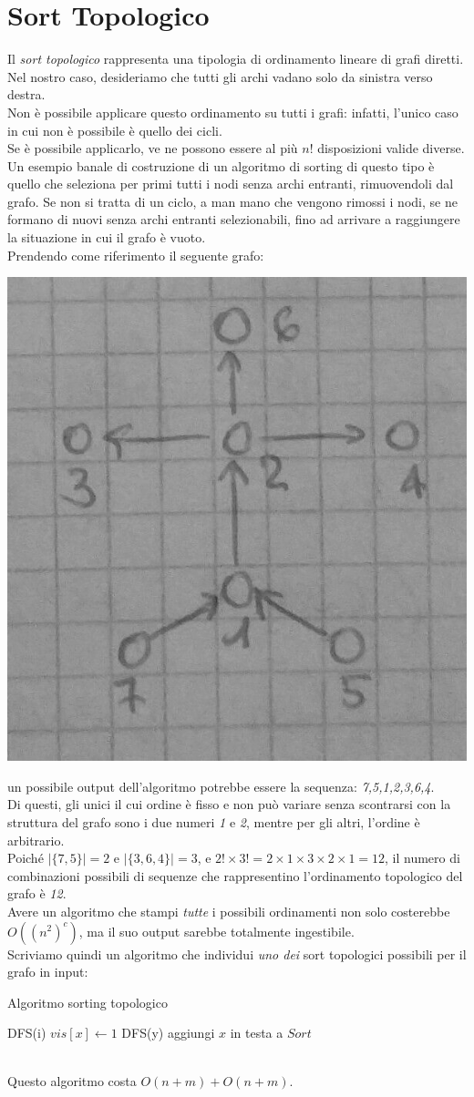 \section{Sort Topologico}
Il \textit{sort topologico} rappresenta una tipologia di ordinamento lineare di grafi diretti. Nel nostro caso, desideriamo che tutti gli archi vadano solo da sinistra verso destra. \\
Non è possibile applicare questo ordinamento su tutti i grafi: infatti, l'unico caso in cui non è possibile è quello dei cicli. \\
Se è possibile applicarlo, ve ne possono essere al più $n!$ disposizioni valide diverse. \\
Un esempio banale di costruzione di un algoritmo di sorting di questo tipo è quello che seleziona per primi tutti i nodi senza archi entranti, rimuovendoli dal grafo. Se non si tratta di un ciclo, a man mano che vengono rimossi i nodi, se ne formano di nuovi senza archi entranti selezionabili, fino ad arrivare a raggiungere la situazione in cui il grafo è vuoto. \\
Prendendo come riferimento il seguente grafo:
\begin{center}
    \includegraphics[width=.2\textwidth]{res/sort-topologico.jpg} \hfill
\end{center}
un possibile output dell'algoritmo potrebbe essere la sequenza: \textit{7,5,1,2,3,6,4}.\\
Di questi, gli unici il cui ordine è fisso e non può variare senza scontrarsi con la struttura del grafo sono i due numeri \textit{1} e \textit{2}, mentre per gli altri, l'ordine è arbitrario. \\
Poiché $|\{7,5\}|=2$ e $|\{3,6,4\}|=3$, e $2!\times 3! = 2\times 1\times 3\times 2\times 1 = 12$, il numero di combinazioni possibili di sequenze che rappresentino l'ordinamento topologico del grafo è \textit{12}. \\
Avere un algoritmo che stampi \textit{tutte} i possibili ordinamenti non solo costerebbe $O((n^2)^c)$, ma il suo output sarebbe totalmente ingestibile. \\
Scriviamo quindi un algoritmo che individui \textit{uno dei} sort topologici possibili per il grafo in input:
\begin{algorithm}
	\caption{Algoritmo sorting topologico}\label{alg:sortTopologico}
	\begin{algorithmic}[1]
				\State DFS(i)
			\EndIf
		\EndFor
		 
			\State $vis[x] \gets 1$
					\State DFS(y)
				\EndIf
			\EndFor
			\State aggiungi $x$ in testa a $Sort$
		\EndFunction
	\end{algorithmic}
\end{algorithm} \hfill \\
Questo algoritmo costa $O(n+m)+O(n+m)$.

